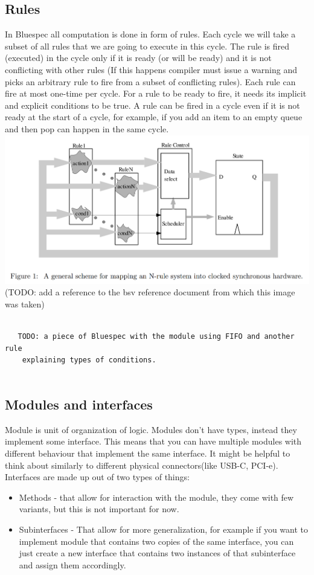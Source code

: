 \documentclass[12pt]{report}
\begin{document}
\subsection{Rules}
In Bluespec all computation is done in form of rules.  
Each cycle we will take a subset of all rules that we are going to execute in this cycle. The rule is fired (executed) in the cycle only if it is ready (or will be ready) and it is not conflicting with other rules (If this happens compiler must issue a warning and picks an arbitrary rule to fire from a subset of conflicting rules). Each rule can fire at most one-time per cycle.  
For a rule to be ready to fire, it needs its implicit and explicit conditions to be true.  
A rule can be fired in a cycle even if it is not ready at the start of a cycle, for example, if you add an item to an empty queue and then pop can happen in the same cycle. \\ 
\includegraphics[width=\textwidth]{Rulemapping.png} 
(TODO: add a reference to the bsv reference document from which this image was taken) 
\begin{verbatim} 
        
   TODO: a piece of Bluespec with the module using FIFO and another rule 
    explaining types of conditions. 
    
\end{verbatim} 

\subsection{Modules and interfaces}
Module is unit of organization of logic. Modules don't have types, instead they implement some interface. This means that you can have multiple modules with different behaviour that implement the same interface. It might be helpful to think about similarly to different physical connectors(like USB-C, PCI-e). Interfaces are made up out of two types of things:
\begin{itemize}
    \item Methods - that allow for interaction with the module, they come with few variants, but this is not important for now.
    \item Subinterfaces - That allow for more generalization, for example if you want to implement module that contains two copies of the same interface, you can just create a new interface that contains two instances of that subinterface and assign them accordingly.
\end{itemize}
\end{document}
